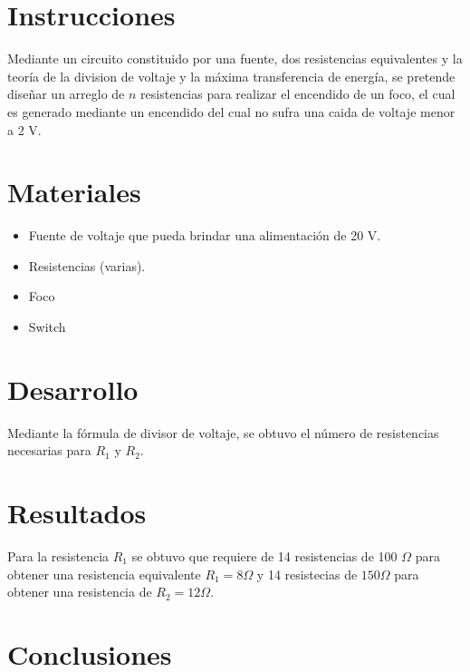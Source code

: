 \documentclass[]{article}
\begin{document}
\section{Instrucciones}

Mediante un circuito constituido por una fuente, dos resistencias equivalentes y
la teoría de la division de voltaje y la máxima transferencia de energía, se
pretende diseñar un arreglo de $n$ resistencias para realizar el encendido de
un foco, el cual es generado mediante un encendido del cual no sufra una caida
de voltaje menor a 2 V.

\section{Materiales}

\begin{itemize}
    \item Fuente de voltaje que pueda brindar una alimentación de 20 V.
    \item Resistencias (varias).
    \item Foco
    \item Switch
    \end{itemize}


\section{Desarrollo}


Mediante la fórmula de divisor de voltaje, se obtuvo el número de resistencias
necesarias para $R_1$ y $R_2$.

\section{Resultados}

Para la resistencia $R_1$ se obtuvo que requiere de 14 resistencias de 100
$\Omega$ para obtener una resistencia equivalente $R_1 = 8 \Omega$ y 14 resistecias
de $150 \Omega$ para obtener una resistencia de $R_2 = 12 \Omega$.


\section{Conclusiones}


\end{document}
